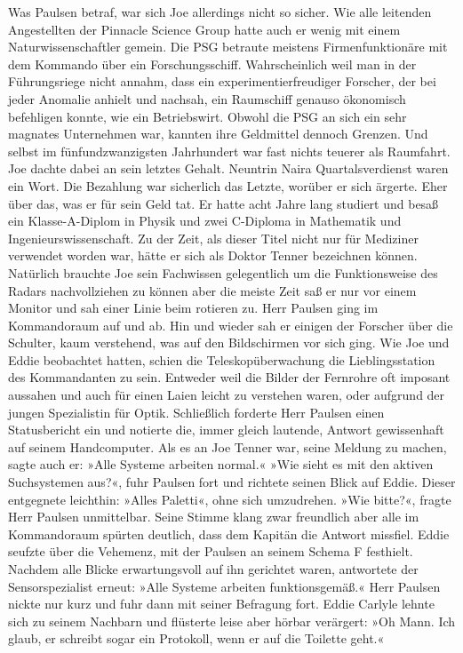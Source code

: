 Was Paulsen betraf, war sich Joe allerdings nicht so sicher. Wie alle leitenden Angestellten der Pinnacle Science Group hatte auch er wenig mit einem Naturwissenschaftler gemein. Die PSG betraute meistens Firmenfunktionäre mit dem Kommando über ein Forschungsschiff. Wahrscheinlich weil man in der Führungsriege nicht annahm, dass ein experimentierfreudiger Forscher, der bei jeder Anomalie anhielt und nachsah, ein Raumschiff genauso ökonomisch befehligen konnte, wie ein Betriebswirt. Obwohl die PSG an sich ein sehr magnates Unternehmen war, kannten ihre Geldmittel dennoch Grenzen. Und selbst im fünfundzwanzigsten Jahrhundert war fast nichts teuerer als Raumfahrt.
Joe dachte dabei an sein letztes Gehalt. Neuntrin Naira Quartalsverdienst waren ein Wort. Die Bezahlung war sicherlich das Letzte, worüber er sich ärgerte. Eher über das, was er für sein Geld tat. Er hatte acht Jahre lang studiert und besaß ein Klasse-A-Diplom in Physik und zwei C-Diploma in Mathematik und Ingenieurswissenschaft. Zu der Zeit, als dieser Titel nicht nur für Mediziner verwendet worden war, hätte er sich als Doktor Tenner bezeichnen können.
Natürlich brauchte Joe sein Fachwissen gelegentlich um die Funktionsweise des Radars nachvollziehen zu können aber die meiste Zeit saß er nur vor einem Monitor und sah einer Linie beim rotieren zu.
Herr Paulsen ging im Kommandoraum auf und ab. Hin und wieder sah er einigen der Forscher über die Schulter, kaum verstehend, was auf den Bildschirmen vor sich ging. Wie Joe und Eddie beobachtet hatten, schien die Teleskopüberwachung die Lieblingsstation des Kommandanten zu sein. Entweder weil die Bilder der Fernrohre oft imposant aussahen und auch für einen Laien leicht zu verstehen waren, oder aufgrund der jungen Spezialistin für Optik.
Schließlich forderte Herr Paulsen einen Statusbericht ein und notierte die, immer gleich lautende, Antwort gewissenhaft auf seinem Handcomputer. Als es an Joe Tenner war, seine Meldung zu machen, sagte auch er: »Alle Systeme arbeiten normal.«
»Wie sieht es mit den aktiven Suchsystemen aus?«, fuhr Paulsen fort und richtete seinen Blick auf Eddie.
Dieser entgegnete leichthin: »Alles Paletti«, ohne sich umzudrehen.
»Wie bitte?«, fragte Herr Paulsen unmittelbar. Seine Stimme klang zwar freundlich aber alle im Kommandoraum spürten deutlich, dass dem Kapitän die Antwort missfiel.
Eddie seufzte über die Vehemenz, mit der Paulsen an seinem Schema F festhielt. Nachdem alle Blicke erwartungsvoll auf ihn gerichtet waren, antwortete der Sensorspezialist erneut: »Alle Systeme arbeiten funktionsgemäß.«
Herr Paulsen nickte nur kurz und fuhr dann mit seiner Befragung fort. Eddie Carlyle lehnte sich zu seinem Nachbarn und flüsterte leise aber hörbar verärgert: »Oh Mann. Ich glaub, er schreibt sogar ein Protokoll, wenn er auf die Toilette geht.«
